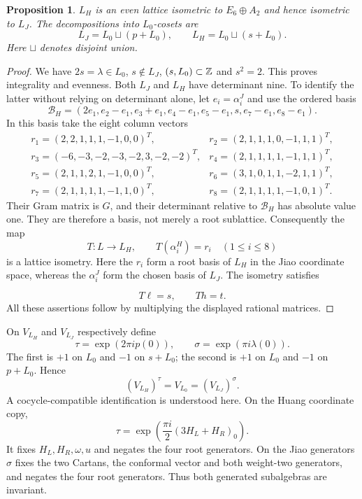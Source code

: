 \documentclass[11pt,reqno]{amsart}
\newtheorem{proposition}[theorem]{Proposition}
\theoremstyle{definition}\newtheorem{definition}[theorem]{Definition}
\theoremstyle{remark}\newtheorem{remark}[theorem]{Remark}
\numberwithin{equation}{section}
\begin{document}
\begin{proposition}\label{prop:lattice}
$L_H$ is an even lattice isometric to $E_6\oplus A_2$ and hence isometric to $L_J$. The decompositions into $L_0$-cosets are
\[
 L_J=L_0\sqcup(p+L_0),\qquad L_H=L_0\sqcup(s+L_0).
\]
Here $\sqcup$ denotes disjoint union.
\end{proposition}
\begin{proof}
We have $2s=\lambda\in L_0$, $s\notin L_J$, $(s,L_0)\subset\mathbb Z$ and $s^2=2$. This proves integrality and evenness. Both $L_J$ and $L_H$ have determinant nine. To identify the latter without relying on determinant alone, let $e_i=\alpha_i^J$ and use the ordered basis
\begin{equation}\label{eq:BHbasis}
 \mathcal B_H=(2e_1,e_2-e_1,e_3+e_1,e_4-e_1,e_5-e_1,s,e_7-e_1,e_8-e_1).
\end{equation}
In this basis take the eight column vectors
\begin{equation}\label{eq:rtable}
\begin{array}{ll}
 r_1=(2,2,1,1,1,-1,0,0)^T,&r_2=(2,1,1,1,0,-1,1,1)^T,\\
 r_3=(-6,-3,-2,-3,-2,3,-2,-2)^T,&r_4=(2,1,1,1,1,-1,1,1)^T,\\
 r_5=(2,1,1,2,1,-1,0,0)^T,&r_6=(3,1,0,1,1,-2,1,1)^T,\\
 r_7=(2,1,1,1,1,-1,1,0)^T,&r_8=(2,1,1,1,1,-1,0,1)^T.
\end{array}
\end{equation}
Their Gram matrix is $G$, and their determinant relative to $\mathcal B_H$ has absolute value one. They are therefore a basis, not merely a root sublattice.
\begingroup
Consequently the map
\[
 T:L\longrightarrow L_H,\qquad T(\alpha_i^H)=r_i
 \quad(1\le i\le8)
\]
is a lattice isometry. Here the $r_i$ form a root basis of $L_H$ in the Jiao coordinate space, whereas the $\alpha_i^J$ form the chosen basis of $L_J$. The isometry satisfies
\par\endgroup
\[
 T\ell=s,\qquad Th=t.
\]
All these assertions follow by multiplying the displayed rational matrices.
\end{proof}

On $V_{L_H}$ and $V_{L_J}$ respectively define
\begin{equation}\label{eq:involutions}
 \tau=\exp(2\pi i p(0)),\qquad \sigma=\exp(\pi i\lambda(0)).
\end{equation}
The first is $+1$ on $L_0$ and $-1$ on $s+L_0$; the second is $+1$ on $L_0$ and $-1$ on $p+L_0$. Hence
\begin{equation}\label{eq:ambientfixed}
 (V_{L_H})^\tau=V_{L_0}=(V_{L_J})^\sigma.
\end{equation}
A cocycle-compatible identification is understood here. On the Huang coordinate copy,
\[
 \tau=\exp\!\left(\frac{\pi i}{2}(3H_L+H_R)_{0}\right).
\]
It fixes $H_L,H_R,\omega,u$ and negates the four root generators. On the Jiao generators $\sigma$ fixes the two Cartans, the conformal vector and both weight-two generators, and negates the four root generators. Thus both generated subalgebras are invariant.
\end{document}
